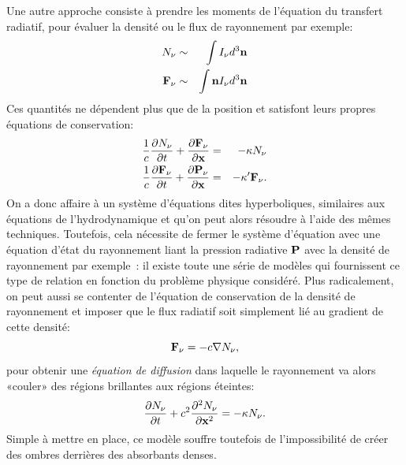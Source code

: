 Une autre approche consiste à prendre les moments de l'équation du transfert radiatif, pour évaluer la densité ou le flux de rayonnement par exemple:
\begin{eqnarray}
N_\nu&\sim&\int I_\nu d^3{\bf n}\\
{\bf F}_\nu&\sim&\int {\bf n} I_\nu d^3{\bf n}
\end{eqnarray}
Ces quantités ne dépendent plus que de la position et satisfont leurs propres équations de conservation:
\begin{eqnarray}
\frac{1}{c}\frac{\partial N_\nu}{\partial t}+\frac{\partial {{\bf F}_\nu}}{\partial {\bf x}}&=&-\kappa N_\nu\\
\frac{1}{c}\frac{\partial {\bf F}_\nu}{\partial t}+\frac{\partial {{\bf P}_\nu}}{\partial {\bf x}}&=&-\kappa' {\bf F}_\nu.
\end{eqnarray}
On a donc affaire à un système d'équations dites hyperboliques, similaires aux équations de l'hydrodynamique et qu'on peut alors résoudre à l'aide des mêmes techniques. Toutefois, cela nécessite de fermer le système d'équation avec une équation d'état du rayonnement liant la pression radiative $\bf P$ avec la densité de rayonnement par exemple~: il existe toute une série de modèles qui fournissent ce type de relation en fonction du problème physique considéré. Plus radicalement, on peut aussi se contenter de l'équation de conservation de la densité de rayonnement et imposer que le flux radiatif soit simplement lié au gradient de cette densité:
\begin{equation}
{\bf F_\nu}=-c\nabla N_\nu,
\end{equation}
pour obtenir une \textit{équation de diffusion} dans laquelle le rayonnement va alors «couler» des régions brillantes aux régions éteintes:
\begin{equation}
\frac{\partial N_\nu}{\partial t}+c^2\frac{\partial^2 {N_\nu}}{\partial {\bf x}^2}=-\kappa N_\nu.
\end{equation}
 Simple à mettre en place, ce modèle souffre toutefois de l'impossibilité de créer des ombres derrières des absorbants denses.

